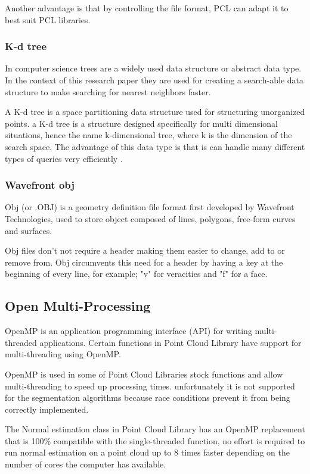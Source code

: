 			Another advantage is that by controlling the file format, PCL can adapt it to best suit PCL libraries. \citep{point_cloud_library_pcd_2010}
		
		\subsubsection{K-d tree}
			In computer science trees are a widely used data structure or abstract data type. In the context of this research paper they are used for creating a search-able data structure to make searching for nearest neighbors faster.
			
			A K-d tree is a space partitioning data structure used for structuring unorganized points. a K-d tree is a structure designed specifically for multi dimensional situations, hence the name k-dimensional tree, where k is the dimension of the search space. The advantage of this data type is that is can handle many different types of queries very efficiently \citep{bentley_multidimensional_1975}.
		
		
		\subsubsection{Wavefront obj}
			Obj (or .OBJ) is a geometry definition file format first developed by Wavefront Technologies, used to store object composed of lines, polygons, free-form curves and surfaces.
			
			Obj files don't not require a header making them easier to change, add to or remove from. Obj circumvents this need for a header by having a key at the beginning of every line, for example; "v" for veracities and "f" for a face.
			 
			 
		
	
	\subsection{Open Multi-Processing}
		OpenMP is an application programming interface (API) for writing multi-threaded applications. Certain functions in Point Cloud Library have support for multi-threading using OpenMP.
		
		OpenMP is used in some of Point Cloud Libraries stock functions and allow multi-threading to speed up processing times. unfortunately it is not supported for the segmentation algorithms because race conditions prevent it from being correctly implemented. 
		
		The Normal estimation class in Point Cloud Library has an OpenMP replacement that is 100\% compatible with the single-threaded function, no effort is required to run normal estimation on a point cloud up to 8 times faster depending on the number of cores the computer has available.
	

	

	
